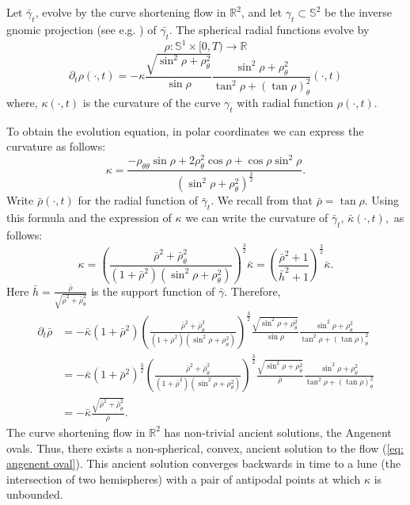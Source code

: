 \documentclass{amsart}
\begin{document}
\begin{example}
Let $\bar{\gamma}_t$, evolve by the curve shortening flow in $\mathbb{R}^2$, and let $\gamma_t \subset \mathbb{S}^2$ be the inverse gnomic projection (see e.g. \cite{BesauWerner:11/2014}) of \(\bar{\gamma_t}\). The spherical radial functions evolve by
\[\rho:\mathbb{S}^1\times[0,T)\to \mathbb{R}\]
\begin{equation}\label{eq: angenent oval}
\partial_t\rho(\cdot,t)=-\kappa \frac{\sqrt{\sin^2\rho+\rho_{\theta}^2}}{\sin\rho}\frac{\sin^2\rho+\rho_{\theta}^2}{\tan^2\rho+(\tan\rho)_{\theta}^2}(\cdot,t)
\end{equation}
where, $\kappa(\cdot,t)$ is the curvature of the curve $\gamma_t$ with radial function $\rho(\cdot,t).$

To obtain the evolution equation, in polar coordinates we can express the curvature as follows:
\[\kappa=\frac{-\rho_{\theta\theta}\sin\rho+2\rho_\theta^2\cos\rho+\cos\rho\sin^2\rho}{(\sin^2\rho+\rho_{\theta}^2)^{\frac{3}{2}}}.\]
Write $\bar{\rho}(\cdot,t)$ for the radial function of $\bar{\gamma}_t$. We recall from \cite[p.~8]{BesauWerner:11/2014} that
$\bar{\rho}=\tan\rho.$ Using this formula and the expression of $\kappa$ we can write the curvature of $\bar{\gamma}_t$,  $\bar{\kappa}(\cdot,t),$ as follows:
\[\kappa=\left(\frac{\bar{\rho}^2+\bar{\rho}_{\theta}^2}{(1+\bar{\rho}^2)(\sin^2\rho+\rho_{\theta}^2)}\right)^{\frac{3}{2}}\bar{\kappa}=\left(\frac{\bar{\rho}^2+1}{\bar{h}^2+1}\right)^{\frac{3}{2}}\bar{\kappa}.\]
Here $\bar{h}=\frac{\bar{\rho}}{\sqrt{\bar{\rho}^2+\bar{\rho}_{\theta}^2}}$ is the support function of $\bar{\gamma}.$
Therefore,
\begin{align*}
\partial_t\bar{\rho}&=-\bar{\kappa}(1+\bar{\rho}^2)\left(\frac{\bar{\rho}^2+\bar{\rho}_{\theta}^2}{(1+\bar{\rho}^2)(\sin^2\rho+\rho_{\theta}^2)}\right)^{\frac{3}{2}}\frac{\sqrt{\sin^2\rho+\rho_{\theta}^2}}{\sin\rho}\frac{\sin^2\rho+\rho_{\theta}^2}{\tan^2\rho+(\tan\rho)_{\theta}^2}\\
&=-\bar{\kappa}(1+\bar{\rho}^2)^{\frac{3}{2}}\left(\frac{\bar{\rho}^2+\bar{\rho}_{\theta}^2}{(1+\bar{\rho}^2)(\sin^2\rho+\rho_{\theta}^2)}\right)^{\frac{3}{2}}\frac{\sqrt{\sin^2\rho+\rho_{\theta}^2}}{\bar{\rho}}\frac{\sin^2\rho+\rho_{\theta}^2}{\tan^2\rho+(\tan\rho)_{\theta}^2}\\
&=-\bar{\kappa}\frac{\sqrt{\bar{\rho}^2+\bar{\rho}_{\theta}^2}}{\bar{\rho}}.
\end{align*}
The curve shortening flow in $\mathbb{R}^2$ has non-trivial ancient solutions, the Angenent ovals. Thus, there exists a non-spherical, convex, ancient solution to the flow (\ref{eq: angenent oval}). This ancient solution converges backwards in time to a lune (the intersection of two hemispheres) with a pair of antipodal points at which \(\kappa\) is unbounded.
\end{example}
\end{document}
